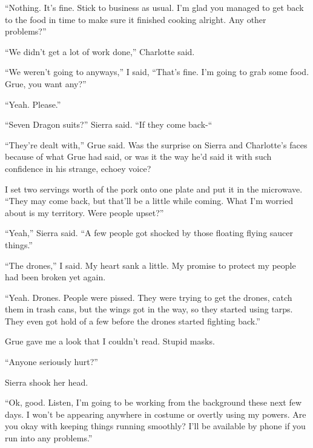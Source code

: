 ``Nothing.  It's fine.  Stick to business as usual.  I'm glad you managed to get back to the food in time to make sure it finished cooking alright.  Any other problems?''



``We didn't get a lot of work done,'' Charlotte said.



``We weren't going to anyways,'' I said, ``That's fine.  I'm going to grab some food.  Grue, you want any?''



``Yeah.  Please.''



``Seven Dragon suits?'' Sierra said.  ``If they come back-``



``They're dealt with,'' Grue said.  Was the surprise on Sierra and Charlotte's faces because of what Grue had said, or was it the way he'd said it with such confidence in his strange, echoey voice?



I set two servings worth of the pork onto one plate and put it in the microwave.  ``They may come back, but that'll be a little while coming.  What I'm worried about is my territory.  Were people upset?''



``Yeah,'' Sierra said.  ``A few people got shocked by those floating flying saucer things.''



``The drones,'' I said.  My heart sank a little.  My promise to protect my people had been broken yet again.



``Yeah.  Drones.  People were pissed.  They were trying to get the drones, catch them in trash cans, but the wings got in the way, so they started using tarps.  They even got hold of a few before the drones started fighting back.''



Grue gave me a look that I couldn't read.  Stupid masks.



``Anyone seriously hurt?''



Sierra shook her head.



``Ok, good.  Listen, I'm going to be working from the background these next few days.  I won't be appearing anywhere in costume or overtly using my powers.  Are you okay with keeping things running smoothly?  I'll be available by phone if you run into any problems.''



